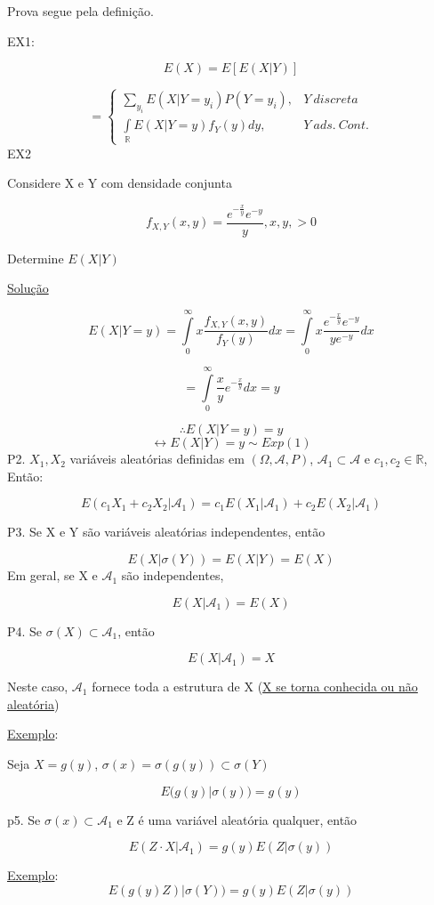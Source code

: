 \documentclass[a4paper,12pt]{article}
\begin{document}
Prova segue pela definição.

EX1:

$$E(X) = E[E(X|Y)] $$

$$=\begin{cases}
\sum\limits_{y_i} E(X|Y=y_i)P(Y=y_i), & Y \ discreta\\
\int\limits_{\mathbb R} E(X|Y=y)f_Y(y)dy, & Y \ ads. \ Cont.
\end{cases} $$
\newpage 
EX2

Considere X e Y com densidade conjunta

$$f_{X,Y}(x,y) =\frac{e^{-\frac{x}{y}} e^{-y}}{y}, x,y,>0 $$

Determine $E(X|Y)$

\underline{Solução}

$$E(X|Y=y) = \int\limits_0^\infty  x \frac{f_{X,Y}(x,y)}{f_Y(y)} dx
=\int\limits_0^\infty  x\frac{e^{-\frac{x}{y}} e^{-y}}{ye^{-y}} dx
$$

$$
= \int\limits_0^\infty \frac{x}{y} e^{-\frac{x}{y}}dx = y
$$

$$\therefore E(X|Y=y) = y $$
$$\leftrightarrow E(X|Y)=y\sim Exp(1) $$
P2. $X_1,X_2$ variáveis aleatórias definidas em $(\Omega,\mathscr{A},P)$, $\mathscr A_1\subset \mathscr A$ e $c_1,c_2 \in \mathbb R$, Então:

$$E(c_1X_1+c_2X_2|\mathscr A_1) = c_1E(X_1|\mathscr A_1) + c_2E(X_2|\mathscr A_1) $$

P3. Se X e Y são variáveis aleatórias independentes, então

$$E(X|\sigma(Y)) = E(X|Y) = E(X) $$
Em geral, se X e $\mathscr A_1$ são independentes,

$$E(X|\mathscr A_1)=E(X) $$

P4. Se $\sigma(X)\subset \mathscr A_1$, então

$$E(X|\mathscr A_1)=X $$

Neste caso, $\mathscr A_1$ fornece toda a estrutura de X (\underline{X se torna conhecida ou não aleatória})

\underline{Exemplo}:

Seja $X=g(y)$, $\sigma(x) = \sigma(g(y))\subset \sigma(Y)$

$$E\bigg(
g(y)|\sigma(y)
\bigg) = g(y) $$

p5. Se $\sigma(x)\subset \mathscr A_1$ e Z é uma variável aleatória qualquer, então

$$E(Z\cdot X|\mathscr A_1) = g(y)E(Z|\sigma(y)) $$

\underline{Exemplo}:
$$E(g(y)Z)|\sigma(Y)) = g(y)E(Z|\sigma(y))$$
\end{document}

